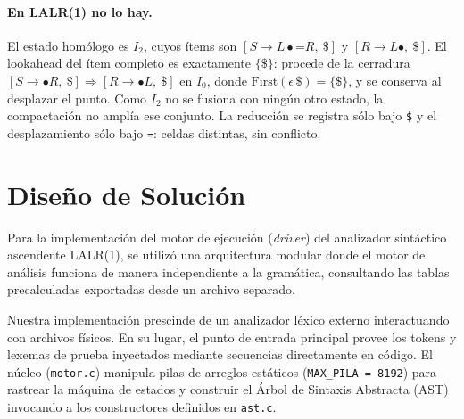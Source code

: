 \documentclass[12pt, letterpaper]{article}
\newcommand{\tl}[1]{\texttt{#1}}
\newcommand{\der}{\ensuremath{\rightarrow}}
\newcommand{\pto}{\ensuremath{\bullet}}
\begin{document}
\paragraph{En LALR(1) no lo hay.} El estado homólogo es $I_2$, cuyos
ítems son $[S \der L \pto \tl{=} R,\ \tl{\$}]$ y
$[R \der L \pto,\ \tl{\$}]$. El lookahead del ítem completo es
exactamente $\{\tl{\$}\}$: procede de la cerradura
$[S \der \pto R,\ \tl{\$}] \Rightarrow [R \der \pto L,\ \tl{\$}]$ en
$I_0$, donde $\mathrm{First}(\epsilon\,\tl{\$}) = \{\tl{\$}\}$, y se
conserva al desplazar el punto. Como $I_2$ no se fusiona con ningún otro
estado, la compactación no amplía ese conjunto. La reducción se registra
sólo bajo \tl{\$} y el desplazamiento sólo bajo \tl{=}: celdas distintas,
sin conflicto.
 



\newpage

\section{Diseño de Solución}

Para la implementación del motor de ejecución (\textit{driver}) del analizador sintáctico ascendente LALR(1), se utilizó una arquitectura modular donde el motor de análisis funciona de manera independiente a la gramática, consultando las tablas precalculadas exportadas desde un archivo separado.

Nuestra implementación prescinde de un analizador léxico externo interactuando con archivos físicos. En su lugar, el punto de entrada principal provee los tokens y lexemas de prueba inyectados mediante secuencias directamente en código. El núcleo (\texttt{motor.c}) manipula pilas de arreglos estáticos (\texttt{MAX\_PILA = 8192}) para rastrear la máquina de estados y construir el Árbol de Sintaxis Abstracta (AST) invocando a los constructores definidos en \texttt{ast.c}.
\end{document}
